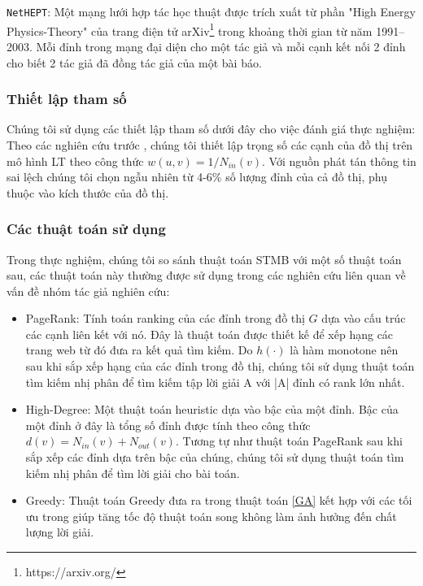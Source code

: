 \texttt{NetHEPT}\cite{kemple1, chen10LT}: Một mạng lưới hợp tác học thuật được trích xuất từ phần "High Energy Physics-Theory" của trang điện tử arXiv\footnote{https://arxiv.org/} trong khoảng thời gian từ năm 1991--2003. Mỗi đỉnh trong mạng đại diện cho một tác giả và mỗi cạnh kết nối 2 đỉnh cho biết 2 tác giả đã đồng tác giả của một bài báo.

\subsubsection{Thiết lập tham số}
Chúng tôi sử dụng các thiết lập tham số dưới đây cho việc đánh giá thực nghiệm:
Theo các nghiên cứu trước \cite{khali, kemple1,chen10LT}, chúng tôi thiết lập trọng số các cạnh của đồ thị trên mô hình LT theo công thức $w(u,v) = 1/N_{in}(v)$. Với nguồn phát tán thông tin sai lệch chúng tôi chọn ngẫu nhiên từ 4-6\% số lượng đỉnh của cả đồ thị, phụ thuộc vào kích thước của đồ thị. 


\subsubsection{Các thuật toán sử dụng}
Trong thực nghiệm, chúng tôi so sánh thuật toán STMB với một số thuật toán sau, các thuật toán này thường được sử dụng trong các nghiên cứu liên quan về vấn đề nhóm tác giả nghiên cứu:
\begin {itemize}
\item PageRank: Tính toán ranking của các đỉnh trong đồ thị $G$ dựa vào cấu trúc các cạnh liên kết với nó. Đây là thuật toán được thiết kế để xếp hạng các trang web từ đó đưa ra kết quả tìm kiếm. Do $h(\cdot)$ là hàm monotone nên sau khi sắp xếp hạng của các đỉnh trong đồ thị, chúng tôi sử dụng thuật toán tìm kiếm nhị phân để tìm kiếm tập lời giải A với |A| đỉnh có rank lớn nhất.
\item High-Degree: Một thuật toán heuristic dựa vào bậc của một đỉnh. Bậc của một đỉnh ở đây là tổng số đỉnh được tính theo công thức $d(v) = N_{in}(v) + N_{out}(v)$. Tương tự như thuật toán PageRank sau khi sắp xếp các đỉnh dựa trên bậc của chúng, chúng tôi sử dụng thuật toán tìm kiếm nhị phân để tìm lời giải cho bài toán.
\item Greedy: Thuật toán Greedy đưa ra trong thuật toán \ref{GA} kết hợp với các tối ưu trong \cite{Jleskovec} giúp tăng tốc độ thuật toán song không làm ảnh hưởng đến chất lượng lời giải.
\end{itemize} 

